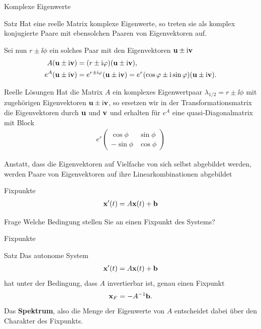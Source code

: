 \begin{frame}{Komplexe Eigenwerte}
  \begin{block}{Satz}
    Hat eine reelle Matrix komplexe Eigenwerte, so treten sie als
    komplex konjugierte Paare mit ebensolchen Paaren von Eigenvektoren
    auf.
  \end{block}
  \pause
  Sei nun $r\pm \ii\phi$ ein solches Paar mit den Eigenvektoren $\mathbf{u}\pm \mathrm i\mathbf{v}$
  \begin{align*}
    A (\mathbf{u}\pm \mathrm i\mathbf{v}) &= (r\pm\mathrm i\varphi) (\mathbf{u}\pm \mathrm i\mathbf{v}),\\
    e^A (\mathbf{u}\pm \mathrm i\mathbf{v}) &= e^{r\pm\mathrm i\varphi} (\mathbf{u}\pm \mathrm i\mathbf{v}) = e^r (\cos\varphi \pm \mathrm i \sin\varphi)(\mathbf{u}\pm \mathrm i\mathbf{v}).
  \end{align*}
\end{frame}

\begin{frame}
  \begin{block}{Reelle Lösungen}
    Hat die Matrix $A$ ein komplexes Eigenwertpaar
    $\lambda_{1/2} = r\pm \ii\phi$ mit zugehörigen Eigenvektoren
    $\mathbf{u}\pm \mathrm i\mathbf{v}$, so ersetzen wir in der Transformationsmatrix die
    Eigenvektoren durch $\mathbf{u}$ und $\mathbf{v}$ und erhalten für $e^A$ eine
    quasi-Diagonalmatrix mit Block
    \begin{gather*}
      e^r
      \begin{pmatrix}
        \cos\phi & \sin\phi\\
        -\sin\phi & \cos \phi
      \end{pmatrix}
    \end{gather*}
  \end{block}

  Anstatt, dass die Eigenvektoren auf Vielfache von sich selbst
  abgebildet werden, werden Paare von Eigenvektoren auf ihre
  Linearkombinationen abgebildet
\end{frame}


\begin{frame}{Fixpunkte}
  \begin{gather*}
    \mathbf{x}'(t) = A\mathbf{x}(t)+\mathbf{b}
  \end{gather*}
  \begin{exampleblock}{Frage}
    Welche Bedingung stellen Sie an einen Fixpunkt des Systems?
  \end{exampleblock}
\end{frame}


\begin{frame}{Fixpunkte}
  \begin{block}{Satz}
  Das autonome System
  \begin{gather*}
    \mathbf{x}'(t) = A\mathbf{x}(t)+\mathbf{b}
  \end{gather*}
  hat unter der Bedingung, dass $A$ invertierbar ist, genau einen Fixpunkt
  \begin{gather*}
    \mathbf{x}_F = -A^{-1}\mathbf{b}.
  \end{gather*}
  Das \textbf{Spektrum}, also die Menge der Eigenwerte von $A$ entscheidet dabei über den Charakter des Fixpunkts.    
  \end{block}
\end{frame}


